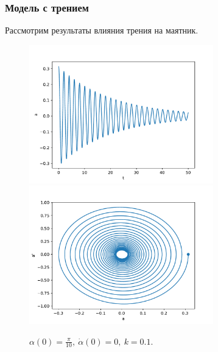         \subsubsection{Модель с трением}
            Рассмотрим результаты влияния трения на маятник.
            \begin{figure}[H]
                \centering
                \includegraphics[width=8cm]{pictures/3resonance1.pdf}
                \includegraphics[width=8cm]{pictures/3resonance1p.pdf}
                \caption{$\alpha(0) = \frac{\pi}{10}, ~ \dot{\alpha}(0) = 0, ~ k = 0.1$.}
            \end{figure}
